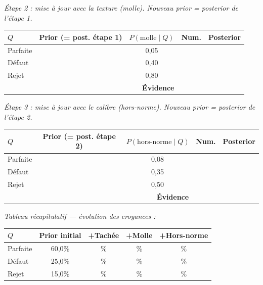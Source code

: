 \documentclass[11pt,a4paper]{article}
\begin{document}
\noindent\textit{Étape 2 : mise à jour avec la texture (molle). Nouveau prior = posterior de l'étape 1.}

\begin{center}
\renewcommand{\arraystretch}{2.2}
\begin{tabular}{|l|c|c|c|c|}
\hline
$Q$ & \textbf{Prior} (= post. étape 1) & $P(\text{molle} \mid Q)$ & \textbf{Num.} & \textbf{Posterior} \\
\hline
Parfaite & \hspace{1.8cm} & 0,05 & \hspace{1.5cm} & \hspace{1.5cm} \\
\hline
Défaut & & 0,40 & & \\
\hline
Rejet & & 0,80 & & \\
\hline
\multicolumn{3}{|r|}{\textbf{Évidence}} & & \\
\hline
\end{tabular}
\end{center}

\noindent\textit{Étape 3 : mise à jour avec le calibre (hors-norme). Nouveau prior = posterior de l'étape 2.}

\begin{center}
\renewcommand{\arraystretch}{2.2}
\begin{tabular}{|l|c|c|c|c|}
\hline
$Q$ & \textbf{Prior} (= post. étape 2) & $P(\text{hors-norme} \mid Q)$ & \textbf{Num.} & \textbf{Posterior} \\
\hline
Parfaite & \hspace{1.8cm} & 0,08 & \hspace{1.5cm} & \hspace{1.5cm} \\
\hline
Défaut & & 0,35 & & \\
\hline
Rejet & & 0,50 & & \\
\hline
\multicolumn{3}{|r|}{\textbf{Évidence}} & & \\
\hline
\end{tabular}
\end{center}

\noindent\textit{Tableau récapitulatif --- évolution des croyances :}

\begin{center}
\renewcommand{\arraystretch}{2.0}
\begin{tabular}{|l|c|c|c|c|}
\hline
$Q$ & \textbf{Prior initial} & \textbf{+Tachée} & \textbf{+Molle} & \textbf{+Hors-norme} \\
\hline
Parfaite & 60,0\% & \hspace{1.5cm}\% & \hspace{1.5cm}\% & \hspace{1.5cm}\% \\
\hline
Défaut & 25,0\% & \% & \% & \% \\
\hline
Rejet & 15,0\% & \% & \% & \% \\
\hline
\end{tabular}
\end{center}
\end{document}
